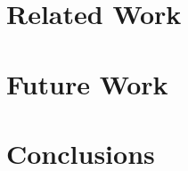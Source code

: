 \documentclass[journal]{IEEEtran}
\begin{document}
%

%

\section{Related Work}
\label{sec:related_work}


\section{Future Work}
\label{sec:future_work}


\section{Conclusions}
\label{sec:conc}




\end{document}
